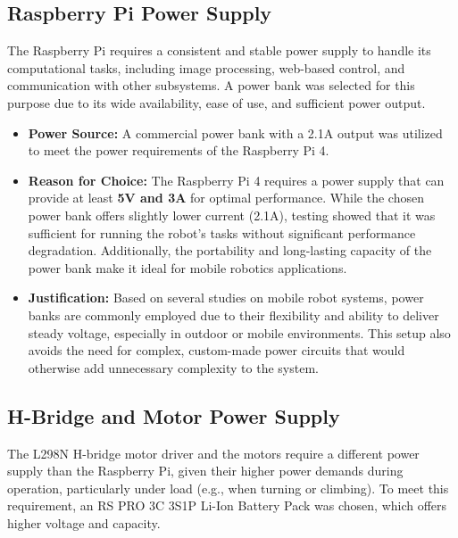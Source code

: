 \subsection{Raspberry Pi Power Supply}
The Raspberry Pi requires a consistent and stable power supply to handle its computational tasks, including image processing, web-based control, and communication with other subsystems. A power bank was selected for this purpose due to its wide availability, ease of use, and sufficient power output.

\begin{itemize}
	\item \textbf{Power Source:} A commercial power bank with a 2.1A output was utilized to meet the power requirements of the Raspberry Pi 4.
	
	\item \textbf{Reason for Choice:} The Raspberry Pi 4 requires a power supply that can provide at least \textbf{5V and 3A} for optimal performance. While the chosen power bank offers slightly lower current (2.1A), testing showed that it was sufficient for running the robot's tasks without significant performance degradation. Additionally, the portability and long-lasting capacity of the power bank make it ideal for mobile robotics applications.
	
	\item \textbf{Justification:} Based on several studies on mobile robot systems, power banks are commonly employed due to their flexibility and ability to deliver steady voltage, especially in outdoor or mobile environments. This setup also avoids the need for complex, custom-made power circuits that would otherwise add unnecessary complexity to the system.
\end{itemize}

\subsection{H-Bridge and Motor Power Supply}
The L298N H-bridge motor driver and the motors require a different power supply than the Raspberry Pi, given their higher power demands during operation, particularly under load (e.g., when turning or climbing). To meet this requirement, an RS PRO 3C 3S1P Li-Ion Battery Pack was chosen, which offers higher voltage and capacity.

